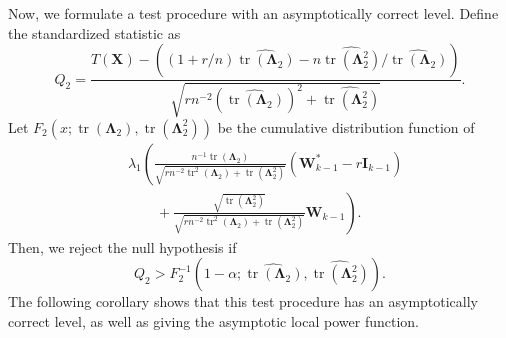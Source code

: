 \documentclass[12pt]{article} %
\DeclareMathOperator{\mytr}{tr}
\newcommand{\bX}{\mathbf{X}}
\newcommand{\bI}{\mathbf{I}}
\newcommand{\bW}{\mathbf{W}}
\newcommand{\bfsym}[1]{\ensuremath{\boldsymbol{#1}}}
\def\bLambda {\bfsym {\Lambda}}
\theoremstyle{definition}
\begin{document}
Now, we formulate a test procedure with an asymptotically correct level.
Define the standardized statistic as
\begin{equation*}
    Q_2=
\frac{
    T(\bX)
    -
    \left((1+r/n)\widehat{\mytr(\bLambda_2)}-n\widehat{\mytr(\bLambda_2^2)}/\widehat{\mytr(\bLambda_2)}\right)
}{
    \sqrt{
        rn^{-2}(\widehat{\mytr(\bLambda_2)})^2+ 
        \widehat{\mytr(\bLambda_2^2)}
    }
}.
\end{equation*}
Let $
F_2(x;\mytr(\bLambda_2),\mytr(\bLambda_2^2))
$ be the cumulative distribution function of
\begin{equation*}
    \begin{split}
&\lambda_1
\left(
\frac{
    n^{-1} \mytr(\bLambda_2)
}{
    \sqrt{
        rn^{-2} \mytr^2 (\bLambda_2) + \mytr(\bLambda_2^2)
    }
}
(\bW_{k-1}^* - r\bI_{k-1})
\right.
\\
&
\quad \quad
+
\left.
\frac{
    \sqrt{\mytr(\bLambda_2^2)}
}{
    \sqrt{
        rn^{-2} \mytr^2 (\bLambda_2) + \mytr(\bLambda_2^2)
    }
}
\bW_{k-1}
\right).
    \end{split}
\end{equation*}
Then, we reject the null hypothesis if
\begin{equation*}
    Q_2
    >
    F_2^{-1}\left(1-\alpha;\widehat{\mytr(\bLambda_2)},\widehat{\mytr(\bLambda_2^2)}\right).
\end{equation*}
The following corollary shows that this test procedure has an asymptotically correct level, as well as giving the asymptotic local power function.
\end{document}

